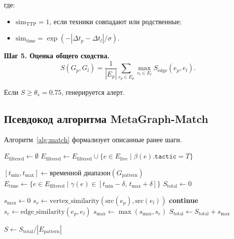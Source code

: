 \documentclass{article}
\begin{document}
где:

\noindent
\begin{itemize} 
    \item $\text{sim}_{\text{TTP}} = 1$, если техники совпадают или родственные;
    \item $\text{sim}_{\text{time}} = \exp(-|\Delta t_p - \Delta t_l| / \sigma)$.
\end{itemize}
\textbf{Шаг 5. Оценка общего сходства.}
\begin{equation}
    S(G_p, G_l) = \frac{1}{|E_p|} \sum_{e_p \in E_p} \max_{e_l \in E_l} S_{\text{edge}}(e_p, e_l).
    \label{eq:total_sim}
\end{equation}

Если $S \geq \theta_s = 0.75$, генерируется алерт.

\subsection{Псевдокод алгоритма MetaGraph-Match}

Алгоритм~\ref{alg:match} формализует описанные ранее шаги.

\begin{algorithm}[H]
\caption{MetaGraph-Match($G_{\text{pattern}}, G_{\text{live}}, \theta_v, \theta_s$)}\label{alg:match}
\begin{algorithmic}[1]

\State $E_{\text{filtered}} \gets \emptyset$
    \State $E_{\text{filtered}} \gets E_{\text{filtered}} \cup \{ e \in E_{\text{live}} \mid \beta(e).\texttt{tactic} = T \}$
\EndFor

\State $[t_{\min}, t_{\max}] \gets \text{временной диапазон}(G_{\text{pattern}})$
\State $E_{\text{time}} \gets \{ e \in E_{\text{filtered}} \mid \gamma(e) \in [t_{\min} - \delta,\, t_{\max} + \delta] \}$
\State $S_{\text{total}} \gets 0$

    \State $s_{\max} \gets 0$
        \State $s_v \gets \text{vertex\_similarity}(\mathrm{src}(e_p), \mathrm{src}(e_l))$
            \State \textbf{continue}
        \EndIf
        \State $s_e \gets \text{edge\_similarity}(e_p, e_l)$
        \State $s_{\max} \gets \max(s_{\max}, s_e)$
    \EndFor
    \State $S_{\text{total}} \gets S_{\text{total}} + s_{\max}$
\EndFor

\State $S \gets S_{\text{total}} / |E_{\text{pattern}}|$
\State {}
\end{algorithmic}
\end{algorithm}
\end{document}
